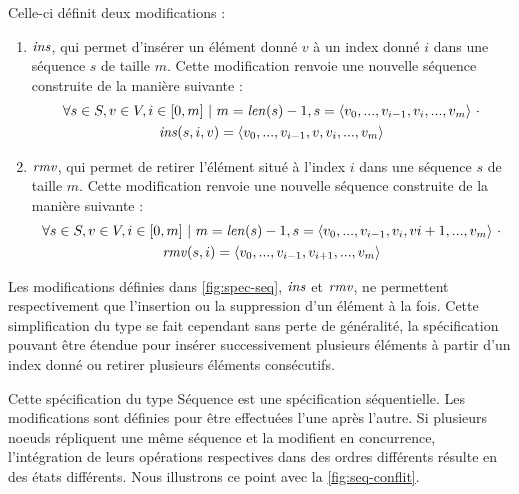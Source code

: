 Celle-ci définit deux modifications :
\begin{enumerate}[label=(\roman*)]
  \item $\mathit{ins}$, qui permet d'insérer un élément donné $v$ à un index donné $i$ dans une séquence $s$ de taille $m$.
    Cette modification renvoie une nouvelle séquence construite de la manière suivante :
    \begin{multline*}
      \forall s \in S, v \in V, i \in [0,m]~|~m = \mathit{len}(s) - 1,
      s = \langle v_0, ..., v_{i-1}, v_{i}, ..., v_m \rangle~\cdot \\
      \mathit{ins}(s,i,v) = \langle v_0, ..., v_{i-1}, v, v_{i}, ..., v_m  \rangle
    \end{multline*}
  \item $\mathit{rmv}$, qui permet de retirer l'élément situé à l'index $i$ dans une séquence $s$ de taille $m$.
    Cette modification renvoie une nouvelle séquence construite de la manière suivante :
    \begin{multline*}
      \forall s \in S, v \in V, i \in [0,m]~|~m = \mathit{len}(s) - 1,
      s = \langle v_0, ..., v_{i-1}, v_{i}, v{i+1}, ..., v_m \rangle~\cdot \\
      \mathit{rmv}(s,i) = \langle v_0, ..., v_{i-1}, v_{i+1}, ..., v_m  \rangle
    \end{multline*}
\end{enumerate}
Les modifications définies dans \autoref{fig:spec-seq}, $\mathit{ins}$ et $\mathit{rmv}$, ne permettent respectivement que l'insertion ou la suppression d'un élément à la fois.
Cette simplification du type se fait cependant sans perte de généralité, la spécification pouvant être étendue pour insérer successivement plusieurs éléments à partir d'un index donné ou retirer plusieurs éléments consécutifs.

Cette spécification du type Séquence est une spécification séquentielle.
Les modifications sont définies pour être effectuées l'une après l'autre.
Si plusieurs noeuds répliquent une même séquence et la modifient en concurrence, l'intégration de leurs opérations respectives dans des ordres différents résulte en des états différents.
Nous illustrons ce point avec la \autoref{fig:seq-conflit}.

